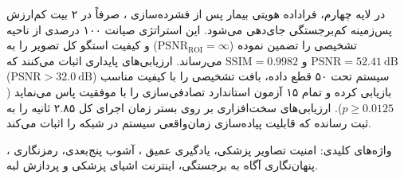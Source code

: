 

در لایه چهارم، فراداده هویتی بیمار پس از فشرده‌سازی ، صرفاً در ۲ بیت کم‌ارزش پس‌زمینه کم‌برجستگی جای‌دهی می‌شود. این استراتژی صیانت ۱۰۰ درصدی از ناحیه تشخیصی را تضمین نموده ($\mathrm{PSNR}_{\mathrm{ROI}} = \infty$) و کیفیت استگو کل تصویر را به $\mathrm{PSNR} = 52.41\mathrm{~dB}$ و $\mathrm{SSIM} = 0.9982$ می‌رساند. ارزیابی‌های پایداری اثبات می‌کنند که سیستم تحت ۵۰ قطع داده، بافت تشخیصی را با کیفیت مناسب ($\mathrm{PSNR} > 32.0\mathrm{~dB}$) بازیابی کرده و تمام ۱۵ آزمون استاندارد تصادفی‌سازی  را با موفقیت پاس می‌نماید ($p \ge 0.0125$). ارزیابی‌های سخت‌افزاری بر روی بستر  زمان اجرای کل ۲.۸۵ ثانیه را به ثبت رسانده که قابلیت پیاده‌سازی زمان‌واقعی سیستم در شبکه  را اثبات می‌کند.\par



واژه‌های کلیدی: امنیت تصاویر پزشکی، یادگیری عمیق ، آشوب پنج‌بعدی، رمزنگاری ، پنهان‌نگاری آگاه به برجستگی، اینترنت اشیای پزشکی و پردازش لبه.\par
